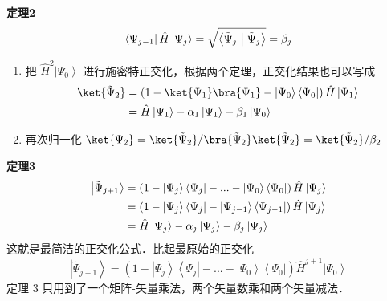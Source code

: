 {\noindent \textbf{定理2}}
\begin{equation}
\left\langle {{\Psi _{j - 1}}} \right|\hat H\left| {{\Psi _j}} \right\rangle  = \sqrt {\left\langle {{{{\tilde \Psi }_j}}}
 \mathrel{\left | {\vphantom {{{{\tilde \Psi }_j}} {{{\tilde \Psi }_j}}}}
 \right. \kern-\nulldelimiterspace}
 {{{{\tilde \Psi }_j}}} \right\rangle }  = {\beta _j}
\end{equation}

\begin{enumerate}[resume]
\item 把 ${\hat H^2}\left| {{\Psi _0}} \right\rangle$ 进行施密特正交化，根据两个定理，正交化结果也可以写成
\begin{equation}
\begin{aligned}
\ket{{{\tilde \Psi }_2}}  &= \left( {1 -\ket{{\Psi _1}}  \bra {{\Psi _1}}  - \left| {{\Psi _0}} \right\rangle \left\langle {{\Psi _0}} \right|} \right)\hat H\left| {{\Psi _1}} \right\rangle \\
   &= \hat H\left| {{\Psi _1}} \right\rangle  - {\alpha _1}\left| {{\Psi _1}} \right\rangle  - {\beta _1}\left| {{\Psi _0}} \right\rangle \\ 
\end{aligned}
\end{equation}
\item 再次归一化  $\ket{\Psi_2} = \ket{\tilde\Psi_2}/\bra{\tilde\Psi_2}\ket{\tilde\Psi_2} = \ket{\tilde\Psi_2}/\beta_2$
\end{enumerate}

{\noindent \textbf{定理3}}
\begin{equation}\begin{aligned}
  \left| {{{\tilde \Psi }_{j + 1}}} \right\rangle  &= \left( {1 - \left| {{\Psi _j}} \right\rangle \left\langle {{\Psi _j}} \right| - ... - \left| {{\Psi _0}} \right\rangle \left\langle {{\Psi _0}} \right|} \right)\hat H\left| {{\Psi _j}} \right\rangle\\
&= \left( {1 - \left| {{\Psi _j}} \right\rangle \left\langle {{\Psi _j}} \right| - \left| {{\Psi _{j - 1}}} \right\rangle \left\langle {{\Psi _{j - 1}}} \right|} \right)\hat H\left| {{\Psi _j}} \right\rangle  \hfill \\
&= \hat H\left| {{\Psi _j}} \right\rangle  - {\alpha _j}\left| {{\Psi _j}} \right\rangle  - {\beta _j}\left| {{\Psi _j}} \right\rangle 
\end{aligned}\end{equation}
这就是最简洁的正交化公式．比起最原始的正交化
\begin{equation}
\left| {{{\tilde \Psi }_{j + 1}}} \right\rangle  = \left( {1 - \left| {{\Psi _j}} \right\rangle \left\langle {{\Psi _j}} \right| - ... - \left| {{\Psi _0}} \right\rangle \left\langle {{\Psi _0}} \right|} \right){\hat H^{j + 1}}\left| {{\Psi _0}} \right\rangle 
\end{equation}
定理 3 只用到了一个矩阵-矢量乘法，两个矢量数乘和两个矢量减法．

